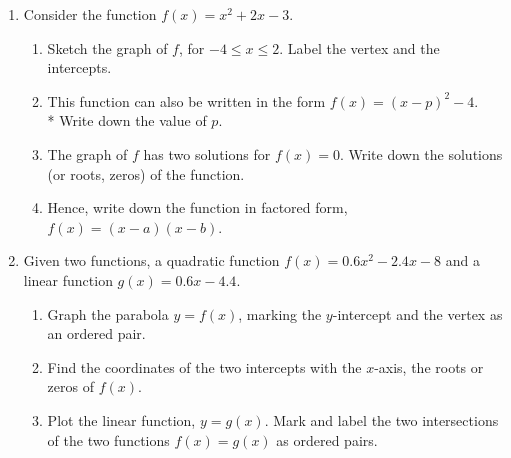 \documentclass[12pt, twoside]{article}
\begin{document}
\begin{enumerate}
\item Consider the function $f(x)=x^2+2x-3$.
\begin{enumerate}
    \item Sketch the graph of $f$, for $-4 \leq x \leq 2$. Label the vertex and the intercepts.
    \item This function can also be written in the form $f(x)=(x-p)^2 -4$.\\* 
    Write down the value of $p$. \vspace{1.5cm}
    \item The graph of $f$ has two solutions for $f(x)=0$. Write down the solutions (or roots, zeros) of the function. \vspace{1.5cm}
    \item Hence, write down the function in factored form, $f(x)=(x-a)(x-b)$. \vspace{1.5cm}
\end{enumerate}
    
\newpage
\item Given two functions, a quadratic function $f(x)=0.6x^2-2.4x-8$ and a linear function $g(x)=0.6x-4.4$.
    \begin{enumerate}%
        \item Graph the parabola $y=f(x)$, marking the $y$-intercept and the vertex as an ordered pair.
        \item Find the coordinates of the two intercepts with the $x$-axis, the roots or zeros of $f(x)$.\vspace{1cm}
        \item Plot the linear function, $y=g(x)$. Mark and label the two intersections of the two functions $f(x)=g(x)$ as ordered pairs.
    \end{enumerate}
    \begin{center}
    \end{center}


\end{enumerate}
\end{document}
